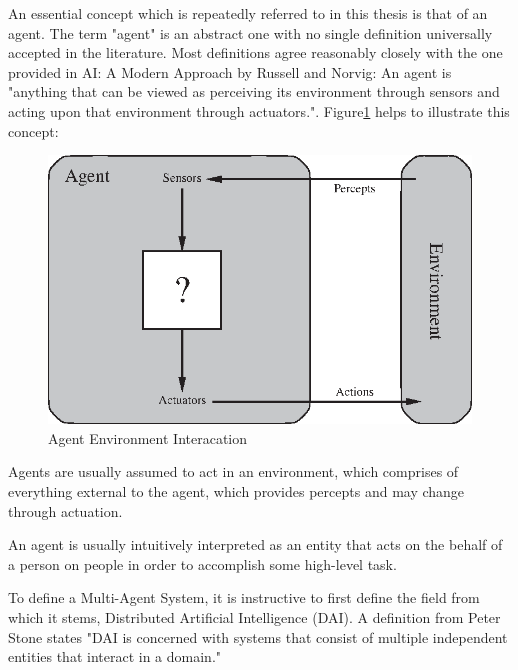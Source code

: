 
An essential concept which is repeatedly referred to in this thesis is that of an agent. The term "agent" is an abstract one with no single definition universally accepted in the literature. Most definitions agree reasonably closely with the one provided in AI: A Modern Approach by Russell and Norvig: An agent is "anything that can be viewed as perceiving its environment through sensors and acting upon that environment through actuators."\cite{AIAMA}. 
Figure\ref{fig:agent_env_interaction} helps to illustrate this concept: \begin{figure}
    \centering
    \includegraphics{Chapters/BackgroundKnowledgeAndRelatedWork/Figs/Vector/agent-environment.eps}
    \caption{Agent Environment Interacation}
    \label{fig:agent_env_interaction}
\end{figure}

Agents are usually assumed to act in an environment, which comprises of everything external to the agent, which provides percepts and may change through actuation.

An agent is usually intuitively interpreted as an entity that acts on the behalf of a person on people in order to accomplish some high-level task.\par


To define a Multi-Agent System, it is instructive to first define the field from which it stems, Distributed Artificial Intelligence (DAI). A definition from Peter Stone states "DAI is concerned with systems that consist of multiple independent entities that interact in a domain."\cite{Stone2000MultiagentPerspective}
